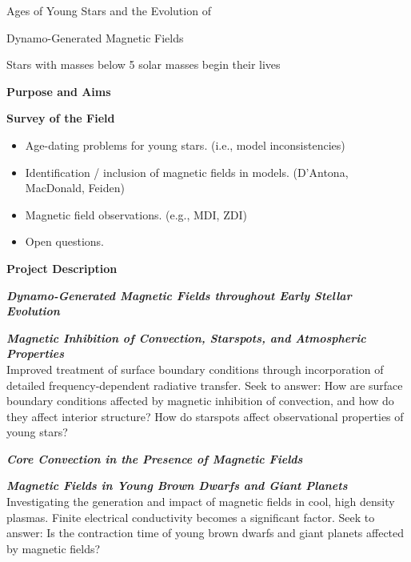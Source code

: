\documentclass[12pt,a4paper]{article}
\begin{document}
\begin{center}
	{\bf {\LARGE Ages of Young Stars and the Evolution of 
	
	Dynamo-Generated Magnetic Fields}} 
	
%	
\end{center}
\vspace{\baselineskip}

Stars with masses below 5 solar masses begin their lives

{\bf \large Purpose and Aims}

{\bf \large Survey of the Field}
\begin{itemize}
	\item Age-dating problems for young stars. (i.e., model inconsistencies)
	\item Identification / inclusion of magnetic fields in models. (D'Antona, MacDonald, Feiden)
	\item Magnetic field observations. (e.g., MDI, ZDI)
	\item Open questions.
\end{itemize}

{\bf \large Project Description}

\textbf{\emph{Dynamo-Generated Magnetic Fields throughout Early Stellar Evolution}}



\textbf{\emph{Magnetic Inhibition of Convection, Starspots, and Atmospheric Properties}} \\
Improved treatment of surface boundary conditions through incorporation of detailed frequency-dependent radiative transfer. Seek to answer: How are surface boundary conditions affected by magnetic inhibition of convection, and how do they affect interior structure? How do starspots affect observational properties of young stars? 

\textbf{\emph{Core Convection in the Presence of Magnetic Fields}}



\textbf{\emph{Magnetic Fields in Young Brown Dwarfs and Giant Planets}} \\
Investigating the generation and impact of magnetic fields in cool, high density plasmas. Finite electrical conductivity becomes a significant factor. Seek to answer: Is the contraction time of young brown dwarfs and giant planets affected by magnetic fields?
\end{document}
